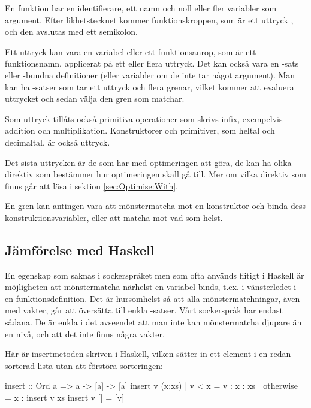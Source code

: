 \documentclass[Rapport]{subfiles}
\begin{document}
En funktion har en identifierare, ett namn och noll eller fler variabler som argument. Efter likhetstecknet
kommer funktionskroppen, som är ett uttryck , och den avslutas med
ett semikolon.

    Ett uttryck kan vara en variabel eller ett funktionsanrop, som är ett
funktionsnamn, applicerat på ett eller flera uttryck. Det kan också vara en -sats eller
-bundna definitioner (eller variabler om de inte tar något argument).
Man kan ha -satser som tar ett uttryck och flera grenar, vilket kommer
att evaluera uttrycket och sedan välja den gren som matchar.

Som uttryck tillåts också primitiva operationer som skrivs infix, exempelvis addition 
och multiplikation. Konstruktorer och primitiver, som heltal och decimaltal, är också uttryck.

Det sista uttrycken är de som har med optimeringen att göra, de kan ha olika direktiv
som bestämmer hur optimeringen skall gå till. Mer om vilka direktiv som finns går
att läsa i sektion \ref{sec:Optimise:With}.

    En gren kan antingen vara att mönstermatcha mot en konstruktor och binda
dess konstruktionsvariabler, eller att matcha mot vad som helst.


\subsection{Jämförelse med Haskell}

    En egenskap som saknas i sockerspråket men som ofta används flitigt i Haskell är 
möjligheten att mönstermatcha närhelst en variabel binds, t.ex. i vänsterledet
i en funktionsdefinition. Det är hursomhelst så att alla mönstermatchningar,
även med vakter, går att översätta till enkla -satser. Vårt sockerspråk
har endast sådana. De är enkla i det avseendet att man inte kan mönstermatcha djupare
än en nivå, och att det inte finns några vakter.

Här är insertmetoden skriven i Haskell, vilken sätter in ett element i en redan sorterad
lista utan att förstöra sorteringen:

\begin{codeEx}
  insert :: Ord a => a -> [a] -> [a]
  insert v (x:xs) 
      | v < x     = v : x : xs
      | otherwise = x : insert v xs 
  insert v [] = [v]
\end{codeEx}                  
\end{document}
